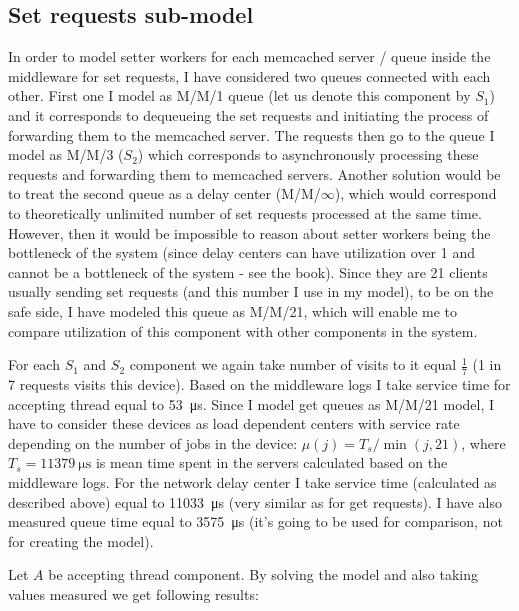 \documentclass[11pt]{article}
\begin{document}
\subsection{Set requests sub-model}

In order to model setter workers for each memcached server / queue inside the middleware for set requests, I have considered two queues connected with each other. First one I model as M/M/1 queue (let us denote this component by $S_1$) and it corresponds to dequeueing the set requests and initiating the process of forwarding them to the memcached server. The requests then go to the queue I model as M/M/3 ($S_2$) which corresponds to asynchronously processing these requests and forwarding them to memcached servers. Another solution would be to treat the second queue as a delay center (M/M/$\infty$), which would correspond to theoretically unlimited number of set requests processed at the same time. However, then it would be impossible to reason about setter workers being the bottleneck of the system (since delay centers can have utilization over 1 and cannot be a bottleneck of the system - see the book). Since they are 21 clients usually sending set requests (and this number I use in my model), to be on the safe side, I have modeled this queue as M/M/21, which will enable me to compare utilization of this component with other components in the system. 

For each $S_1$ and $S_2$ component we again take number of visits to it equal $\frac{1}{7}$ (1 in 7 requests visits this device).
Based on the middleware logs I take service time for accepting thread equal to \SI{53}{\micro\second}.
Since I model get queues as M/M/21 model, I have to consider these devices as load dependent centers with service rate depending on the number of jobs in the device: $\mu(j) = T_s / \min(j, 21)$, where $T_s = \SI{11379}{\micro\second}$
is mean time spent in the servers calculated based on the middleware logs. 
For the network delay center I take service time (calculated as described above) equal to \SI{11033}{\micro\second} (very similar as for get requests).
I have also measured queue time equal to \SI{3575}{\micro\second} (it's going to be used for comparison, not for creating the model).

Let $A$ be accepting thread component. By solving the model and also taking values measured we get following results:
\end{document}
